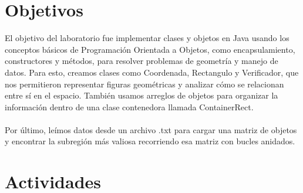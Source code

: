 \documentclass[12pt]{article}
\begin{document}
\section{Objetivos}
El objetivo del laboratorio fue implementar clases y objetos en Java
usando los conceptos básicos de Programación Orientada a Objetos, como
encapsulamiento, constructores y métodos, para resolver problemas de
geometría y manejo de datos.  Para esto, creamos clases como
Coordenada, Rectangulo y Verificador, que nos permitieron representar
figuras geométricas y analizar cómo se relacionan entre sí en el
espacio. También usamos arreglos de objetos para organizar la
información dentro de una clase contenedora llamada ContainerRect.
\\\\
\noindent Por último, leímos datos desde un archivo .txt para cargar una matriz de
objetos y encontrar la subregión más valiosa recorriendo esa matriz
con bucles anidados.


\newpage
\section{Actividades}
\end{document}
